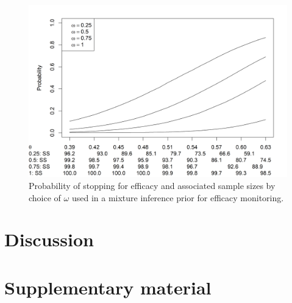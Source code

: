 \documentclass[12pt]{article}
\begin{document}
\begin{figure}\begin{center}
    \centering\includegraphics[width=7in]{./FIGURES/figure6.png}
    \caption{Probability of stopping for efficacy and associated sample sizes by choice of $\omega$ used in a mixture inference prior for efficacy monitoring.}
\label{fig:varyomega}
 \end{center}\end{figure}


\section{Discussion}

\section{Supplementary material}
\end{document}

